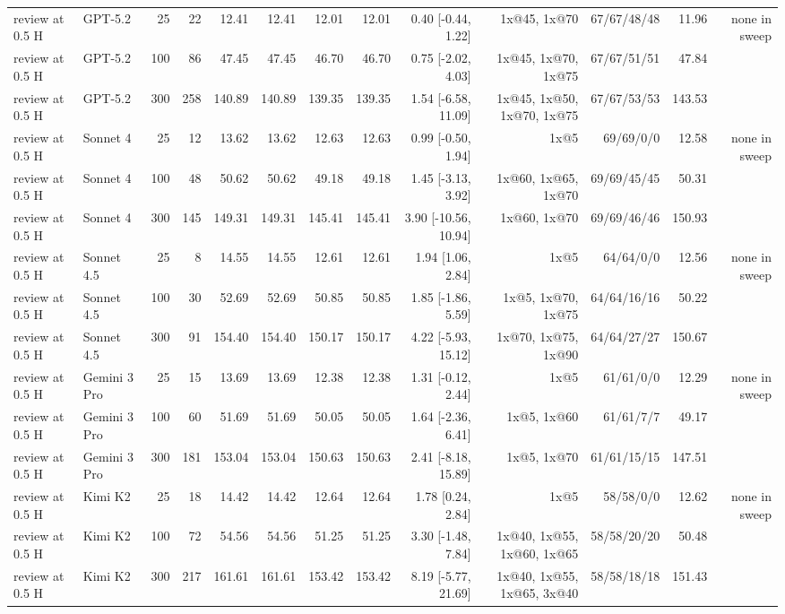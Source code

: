 \begin{table}[t]
\begin{tabular}{llrrrrrrrrrrr}
review at 0.5 H & GPT-5.2 & 25 & 22 & 12.41 & 12.41 & 12.01 & 12.01 & 0.40 [-0.44, 1.22] & 1x@45, 1x@70 & 67/67/48/48 & 11.96 & none in sweep \\
review at 0.5 H & GPT-5.2 & 100 & 86 & 47.45 & 47.45 & 46.70 & 46.70 & 0.75 [-2.02, 4.03] & 1x@45, 1x@70, 1x@75 & 67/67/51/51 & 47.84 &  \\
review at 0.5 H & GPT-5.2 & 300 & 258 & 140.89 & 140.89 & 139.35 & 139.35 & 1.54 [-6.58, 11.09] & 1x@45, 1x@50, 1x@70, 1x@75 & 67/67/53/53 & 143.53 &  \\
review at 0.5 H & Sonnet 4 & 25 & 12 & 13.62 & 13.62 & 12.63 & 12.63 & 0.99 [-0.50, 1.94] & 1x@5 & 69/69/0/0 & 12.58 & none in sweep \\
review at 0.5 H & Sonnet 4 & 100 & 48 & 50.62 & 50.62 & 49.18 & 49.18 & 1.45 [-3.13, 3.92] & 1x@60, 1x@65, 1x@70 & 69/69/45/45 & 50.31 &  \\
review at 0.5 H & Sonnet 4 & 300 & 145 & 149.31 & 149.31 & 145.41 & 145.41 & 3.90 [-10.56, 10.94] & 1x@60, 1x@70 & 69/69/46/46 & 150.93 &  \\
review at 0.5 H & Sonnet 4.5 & 25 & 8 & 14.55 & 14.55 & 12.61 & 12.61 & 1.94 [1.06, 2.84] & 1x@5 & 64/64/0/0 & 12.56 & none in sweep \\
review at 0.5 H & Sonnet 4.5 & 100 & 30 & 52.69 & 52.69 & 50.85 & 50.85 & 1.85 [-1.86, 5.59] & 1x@5, 1x@70, 1x@75 & 64/64/16/16 & 50.22 &  \\
review at 0.5 H & Sonnet 4.5 & 300 & 91 & 154.40 & 154.40 & 150.17 & 150.17 & 4.22 [-5.93, 15.12] & 1x@70, 1x@75, 1x@90 & 64/64/27/27 & 150.67 &  \\
review at 0.5 H & Gemini 3 Pro & 25 & 15 & 13.69 & 13.69 & 12.38 & 12.38 & 1.31 [-0.12, 2.44] & 1x@5 & 61/61/0/0 & 12.29 & none in sweep \\
review at 0.5 H & Gemini 3 Pro & 100 & 60 & 51.69 & 51.69 & 50.05 & 50.05 & 1.64 [-2.36, 6.41] & 1x@5, 1x@60 & 61/61/7/7 & 49.17 &  \\
review at 0.5 H & Gemini 3 Pro & 300 & 181 & 153.04 & 153.04 & 150.63 & 150.63 & 2.41 [-8.18, 15.89] & 1x@5, 1x@70 & 61/61/15/15 & 147.51 &  \\
review at 0.5 H & Kimi K2 & 25 & 18 & 14.42 & 14.42 & 12.64 & 12.64 & 1.78 [0.24, 2.84] & 1x@5 & 58/58/0/0 & 12.62 & none in sweep \\
review at 0.5 H & Kimi K2 & 100 & 72 & 54.56 & 54.56 & 51.25 & 51.25 & 3.30 [-1.48, 7.84] & 1x@40, 1x@55, 1x@60, 1x@65 & 58/58/20/20 & 50.48 &  \\
review at 0.5 H & Kimi K2 & 300 & 217 & 161.61 & 161.61 & 153.42 & 153.42 & 8.19 [-5.77, 21.69] & 1x@40, 1x@55, 1x@65, 3x@40 & 58/58/18/18 & 151.43 &  \\

\end{tabular}
\end{table}
